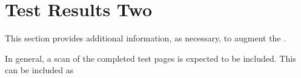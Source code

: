 
\chapter{Test Results Two}
\label{loc:TestResultsTwo}


This section provides additional information, as necessary, to augment the \STR.

In general, a scan of the completed \STS test pages is expected to be included.
This can be included as 

\ifpdf

\else
\fi